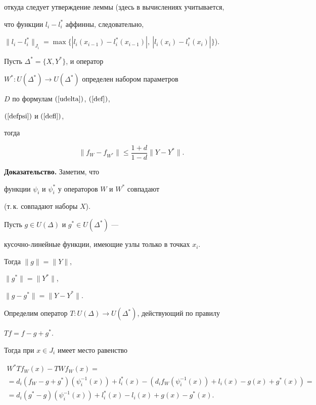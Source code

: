 откуда следует утверждение леммы (здесь в вычислениях учитывается,


что функции $l_i-l_i^*$ аффинны, следовательно,


$\| l_i-l_i^* \|_{J_i} =


\max\{ | l_i(x_{i-1})-l_i^*(x_{i-1}) |,\ | l_i(x_{i})-l_i^*(x_{i}) | \}$).





\begin{lem} \label{lusy}


Пусть $\Delta^*=\{ X,Y^* \}$, и оператор


$W^* : U (\Delta^*) \to U (\Delta^*)$ определен набором параметров


$D$ по формулам $(\ref{udelta})$, $(\ref{def})$,


$(\ref{defpsi})$ и $(\ref{defl})$,


тогда


$$




\|f_W -f_{W^*}\| \le \frac{1+d}{1-d} \|Y-Y^*\|.




$$


\end{lem}





{\bf Доказательство.} Заметим, что


функции $\psi_i$ и $\psi_i^*$ у операторов $W$ и $W^*$ совпадают


(т.\,к. совпадают наборы $X$).


Пусть $g \in U(\Delta) $ и $g^* \in U(\Delta^*) $ ---


кусочно-линейные функции, имеющие узлы только в точках $x_i$.


Тогда $\|g\| = \|Y\|$,


$\|g^*\| = \|Y^*\|$,


$\| g- g^*\| = \|Y-Y^*\| $.


Определим оператор $T: U(\Delta) \to U(\Delta^*) $, действующий по правилу


$T f = f - g + g^*$.


Тогда при $x \in J_i$ имеет место равенство


\begin{multline*}


W^* Tf_W (x) - T W f_W (x) = \\ = d_i (f_W - g + g^*)(\psi_i^{-1}(x))


+ l_i^* (x) - \left(d_i f_W (\psi_i^{-1}(x))


+ l_i (x) - g(x) + g^*(x) \right) = \\


%


= d_i (g^* - g) (\psi_i^{-1}(x)) + l_i^* (x) - l_i(x) + g (x) - g^* (x).


\end{multline*}


